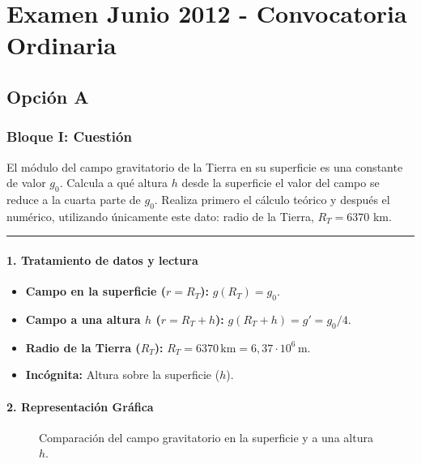 \chapter{Examen Junio 2012 - Convocatoria Ordinaria}
\label{chap:2012_jun_ord}

\section{Opción A}
\label{sec:A_2012_jun_ord}

\subsection{Bloque I: Cuestión}
\label{subsec:A1_2012_jun_ord}
\begin{cajaenunciado}
El módulo del campo gravitatorio de la Tierra en su superficie es una constante de valor $g_0$. Calcula a qué altura $h$ desde la superficie el valor del campo se reduce a la cuarta parte de $g_0$. Realiza primero el cálculo teórico y después el numérico, utilizando únicamente este dato: radio de la Tierra, $R_{T}=6370$ km.
\end{cajaenunciado}
\hrule

\subsubsection*{1. Tratamiento de datos y lectura}
\begin{itemize}
    \item \textbf{Campo en la superficie ($r=R_T$):} $g(R_T) = g_0$.
    \item \textbf{Campo a una altura $h$ ($r=R_T+h$):} $g(R_T+h) = g' = g_0/4$.
    \item \textbf{Radio de la Tierra ($R_T$):} $R_T = 6370\,\text{km} = 6,37 \cdot 10^6\,\text{m}$.
    \item \textbf{Incógnita:} Altura sobre la superficie ($h$).
\end{itemize}

\subsubsection*{2. Representación Gráfica}
\begin{figure}[H]
    \centering
    \caption{Comparación del campo gravitatorio en la superficie y a una altura $h$.}
\end{figure}

